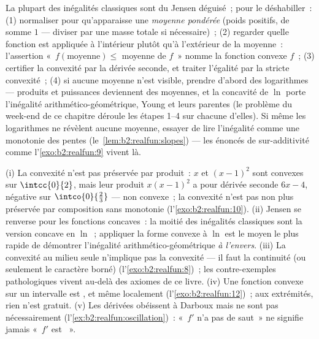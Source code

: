\begin{method}\label{met:b2:realfun:spotting}
La plupart des inégalités classiques sont du Jensen déguisé~; pour le
déshabiller~: (1) normaliser pour qu'apparaisse une \emph{moyenne
pondérée} (poids positifs, de somme $1$ --- diviser par une masse
totale si nécessaire)~; (2) regarder quelle fonction est appliquée à
l'intérieur plutôt qu'à l'extérieur de la moyenne~: l'assertion
«~$f(\text{moyenne}) \leq$ moyenne de $f$~» nomme la fonction convexe
$f$~; (3) certifier la convexité par la dérivée seconde, et traiter
l'égalité par la stricte convexité~; (4) si aucune moyenne n'est
visible, prendre d'abord des logarithmes --- produits et puissances
deviennent des moyennes, et la concavité de $\ln$ porte l'inégalité
arithmético-géométrique, Young et leurs parentes (le problème du
week-end de ce chapitre déroule les étapes 1--4 sur chacune d'elles).
Si même les logarithmes ne révèlent aucune moyenne, essayer de lire
l'inégalité comme une monotonie des pentes
(le~\cref{lem:b2:realfun:slopes}) --- les énoncés de sur-additivité
comme l'\cref{exo:b2:realfun:9} vivent là.
\end{method}

\begin{remark}\label{rem:b2:realfun:pitfalls}
(i) La convexité n'est pas préservée par produit~: $x$ et $(x - 1)^2$
sont convexes sur $\intcc{0}{2}$, mais leur produit $x(x-1)^2$ a pour
dérivée seconde $6x - 4$, négative sur
$\intco{0}{\frac23}$ --- non convexe~; la convexité n'est pas non
plus préservée par composition sans monotonie
(l'\cref{exo:b2:realfun:10}). (ii) Jensen se renverse pour les
fonctions concaves~: la moitié des inégalités classiques sont la
version concave en $\ln$~; appliquer la forme convexe à $\ln$ est le
moyen le plus rapide de démontrer l'inégalité arithmético-géométrique
\emph{à l'envers}. (iii) La convexité au milieu seule n'implique pas
la convexité --- il faut la continuité (ou seulement le caractère
borné) (l'\cref{exo:b2:realfun:8})~; les contre-exemples
pathologiques vivent au-delà des axiomes de ce livre. (iv) Une
fonction convexe sur un intervalle \emph{} est , et
même localement  (l'\cref{exo:b2:realfun:12})~; aux
extrémités, rien n'est gratuit. (v) Les dérivées obéissent à Darboux
mais ne sont pas nécessairement 
(l'\cref{ex:b2:realfun:oscillation})~: «~$f'$ n'a pas de saut~» ne
signifie jamais «~$f'$ est ~».
\end{remark}

